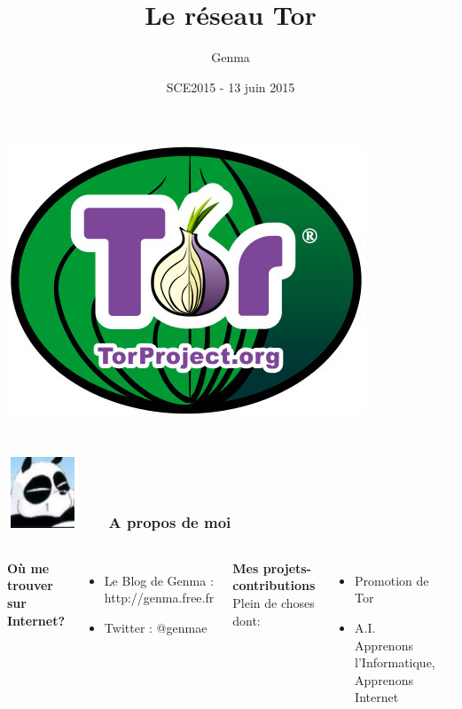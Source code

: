 \documentclass{beamer}
\title[Tor et le Tor Browser Bundle]{Le réseau Tor}
\author{Genma}
\date{SCE2015 - 13 juin 2015}
\begin{document}
\begin{frame}
	\titlepage
	\begin{center}
		\includegraphics[scale=0.2]{./images/logo_tor.jpg}
		\\		
		\\[2.5ex]
		{\tiny\CcNote{\CcLongnameByNcSa}}
		\vspace*{-2.5ex}
	\end{center}
\end{frame}

\begin{frame}
\frametitle{\includegraphics[scale=0.4]{./images/Genma.jpg} \ \ \  A propos de moi  }
\begin{columns}[c] 

\textbf{Où me trouver sur Internet?}
\begin{itemize}
\item Le Blog de Genma : http://genma.free.fr
\item Twitter : @genmae
\end{itemize}
\textbf{Mes projets-contributions}
\\ Plein de choses dont:
\begin{itemize}
\item Promotion de Tor
\item A.I. Apprenons l'Informatique, Apprenons Internet
\end{itemize}

\includegraphics[width=5cm,height=5cm]{./images/blog.png} 
\end{columns}
\end{frame}
\end{document}
